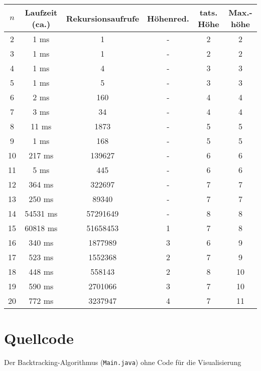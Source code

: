 \documentclass[a4paper, notitlepage, 12pt]{scrartcl}
\newenvironment{longlisting}{\captionsetup{type=listing}}{}
\begin{document}
 \begin{center}
 \begin{tabular}{|c|c|c|c|c|c|}
  \hline
 $n$ & Laufzeit (ca.) & Rekursionsaufrufe & Höhenred. & tats. Höhe & Max.-höhe \\ \hline
2 & 1 ms & 1 & - & 2& 2\\
3 & 1 ms & 1 & - & 2& 2\\
4 & 1 ms & 4 & - & 3& 3\\
5 & 1 ms & 5 & - & 3& 3\\
6 & 2 ms & 160 & - &4 & 4\\
7 & 3 ms & 34 & - & 4& 4\\
8 & 11 ms & 1873 & - &5 & 5\\
9 & 1 ms & 168 & - & 5& 5\\
10 & 217 ms & 139627 & - &6 & 6\\
11 & 5 ms & 445 & - & 6& 6\\
12 & 364 ms & 322697 & - & 7& 7\\
13 & 250 ms & 89340 & - & 7& 7\\
14 & 54531 ms & 57291649 & - &8 & 8\\ \hline \hline
15 & 60818 ms & 51658453 & 1 & 7& 8\\
16 & 340 ms & 1877989 & 3 & 6& 9\\
17 & 523 ms & 1552368 & 2 & 7& 9\\
18 & 448 ms & 558143 & 2 & 8& 10\\
19 & 590 ms & 2701066 & 3 & 7& 10\\
20 & 772 ms & 3237947 & 4 & 7& 11\\ \hline
 \end{tabular}
 \end{center}
 \section{Quellcode}
 \renewcommand{\listingscaption}{Quellcode}
 
 \begin{longlisting}
 \caption{Der Backtracking-Algorithmus (\texttt{Main.java}) ohne Code für die Visualisierung}
 \end{longlisting}
 
 
\end{document}
